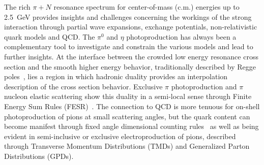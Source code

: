\documentclass[aps,prc,twocolumn,floatfix,showpacs,preprintnumbers,amsmath,amssymb,superscriptaddress]{revtex4-1}
\begin{document}
The rich $\pi + N$ resonance spectrum for center-of-mass (c.m.) energies up to 2.5~GeV provides insights and challenges concerning the workings of the strong interaction through partial wave expansions, exchange potentials, non-relativistic quark models and QCD. The $\pi^0$ and 
$\eta$ photoproduction has always been a complementary tool to investigate and constrain 
the various models and lead to further insights. At the interface between the crowded low energy resonance cross section and the smooth higher energy behavior, traditionally described by Regge poles~\cite{Ader}, lies a region in which hadronic duality provides an interpolation description of the cross section behavior. Exclusive $\pi$ photoproduction and $\pi$ nucleon elastic scattering show this duality in a semi-local sense through Finite Energy Sum Rules (FESR)~\cite{Armenian}. The connection to QCD is more tenuous for on-shell photoproduction of pions at small scattering angles, but the quark content can become manifest through fixed angle dimensional counting rules~\cite{Stan} as well as being evident in semi-inclusive or exclusive electroproduction of pions, described through Transverse Momentum Distributions (TMDs)  and Generalized Parton Distributions (GPDs).
\end{document}

